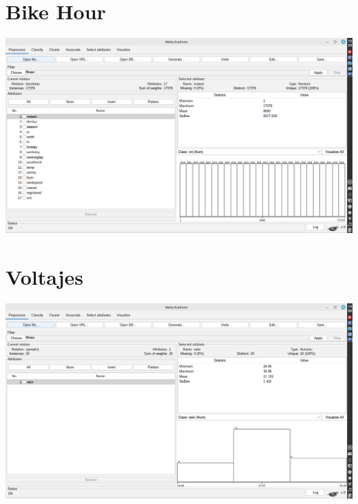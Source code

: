 \documentclass[11pt]{article}
\begin{document}
\section{Bike Hour}
\label{sec:org13ba803}
\begin{center}
\includegraphics[width=.9\linewidth]{./img/bike_hour.png}
\end{center}

\section{Voltajes}
\label{sec:orgca9e07d}
\begin{center}
\includegraphics[width=.9\linewidth]{./img/voltajes.png}
\end{center}
\end{document}

